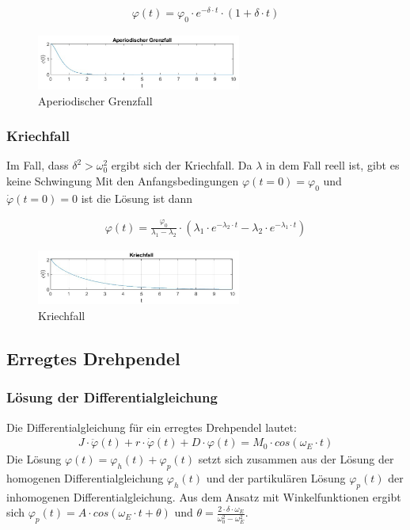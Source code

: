 \documentclass{article}
\begin{document}
\begin{gather} \label{eq:aper_leos}
    \varphi(t) = \varphi_0 \cdot e^{-\delta \cdot t} \cdot (1 + \delta \cdot t)
\end{gather}

\begin{figure}[H]
    \centering
    \includegraphics[width=0.6\textwidth]{bilder/aperiodischer_grenzfall.png}
    \caption{Aperiodischer Grenzfall}
    \label{fig:aperiod}
\end{figure}

\subsubsection{Kriechfall}
Im Fall, dass $\delta^2 > \omega_0^2$ ergibt sich der Kriechfall. Da $\lambda$ in dem Fall reell ist, gibt es keine Schwingung
Mit den Anfangsbedingungen $\varphi(t = 0) = \varphi_0$ und $\dot \varphi(t = 0) = 0$ ist die Lösung ist dann


\begin{gather} \label{eq:kriech_loes}
    \varphi(t) = \frac{\varphi_0}{\lambda_1 - \lambda_2} \cdot (\lambda_1 \cdot e^{- \lambda_2 \cdot t} - \lambda_2 \cdot e^{- \lambda_1 \cdot t})
\end{gather}

\begin{figure}[H]
    \centering
    \includegraphics[width=0.6\textwidth]{bilder/kriechfall.png}
    \caption{Kriechfall}
    \label{fig:kriech}
\end{figure}

\subsection{Erregtes Drehpendel}
\subsubsection{Lösung der Differentialgleichung}
Die Differentialgleichung für ein erregtes Drehpendel lautet:
\begin{gather} \label{eq:schwingung_partikulaere_loesung}
    J \cdot \ddot \varphi(t) + r \cdot \dot \varphi(t) + D \cdot \varphi(t) = M_0 \cdot cos(\omega_E \cdot t)
\end{gather}
Die Lösung $\varphi(t) = \varphi_h(t) + \varphi_p(t)$ setzt sich zusammen aus der Lösung der homogenen Differentialgleichung $\varphi_h(t)$ und der partikulären Lösung $\varphi_p(t)$ der inhomogenen
Differentialgleichung. Aus dem Ansatz mit Winkelfunktionen ergibt sich
$\varphi_p(t) = A \cdot cos(\omega_E \cdot t + \theta)$ und $\theta = \frac{2 \cdot \delta \cdot \omega_E}{\omega_0^2 - \omega_E^2}$.
\end{document}
